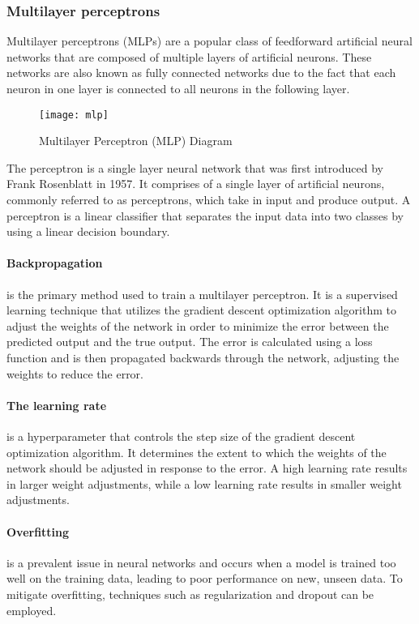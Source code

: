 \subsubsection{Multilayer perceptrons}

Multilayer perceptrons (MLPs) are a popular class of feedforward artificial neural networks that are composed of multiple layers of artificial neurons.
These networks are also known as fully connected networks due to the fact that each neuron in one layer is connected to all neurons in the following layer.

\begin{figure}[ht]
  \centering
  \texttt{[image: mlp]}
  \caption{Multilayer Perceptron (MLP) Diagram \cite{uc}}
\end{figure}

The perceptron is a single layer neural network that was first introduced by Frank Rosenblatt in 1957. 
It comprises of a single layer of artificial neurons, commonly referred to as perceptrons, which take in input and produce output. A perceptron is a linear classifier that separates the input data into two classes by using a linear decision boundary.

\paragraph{Backpropagation} is the primary method used to train a multilayer perceptron. It is a supervised learning technique that utilizes the gradient descent optimization algorithm to adjust the weights of the network in order to minimize the error between the predicted output and the true output. The error is calculated using a loss function and is then propagated backwards through the network, adjusting the weights to reduce the error.

\paragraph {The learning rate} is a hyperparameter that controls the step size of the gradient descent optimization algorithm. It determines the extent to which the weights of the network should be adjusted in response to the error. A high learning rate results in larger weight adjustments, while a low learning rate results in smaller weight adjustments.

\paragraph {Overfitting} is a prevalent issue in neural networks and occurs when a model is trained too well on the training data, leading to poor performance on new, unseen data. To mitigate overfitting, techniques such as regularization and dropout can be employed.

